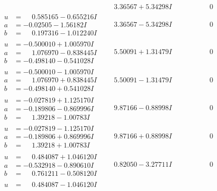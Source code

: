 \documentclass[1p]{elsarticle_modified}
\theoremstyle{definition}
\begin{document}
$$\begin{array}{c|c|c}
 & \phantom{-}3.36567 + 5.34298 I & \phantom{-0.000000 } 0 \\ \hline\begin{aligned}
u &= \phantom{-}0.585165 - 0.655216 I \\
a &= -0.02505 - 1.56182 I \\
b &= \phantom{-}0.197316 - 1.012240 I\end{aligned}
 & \phantom{-}3.36567 - 5.34298 I & \phantom{-0.000000 } 0 \\ \hline\begin{aligned}
u &= -0.500010 + 1.005970 I \\
a &= \phantom{-}1.076970 - 0.838445 I \\
b &= -0.498140 - 0.541028 I\end{aligned}
 & \phantom{-}5.50091 + 1.31479 I & \phantom{-0.000000 } 0 \\ \hline\begin{aligned}
u &= -0.500010 - 1.005970 I \\
a &= \phantom{-}1.076970 + 0.838445 I \\
b &= -0.498140 + 0.541028 I\end{aligned}
 & \phantom{-}5.50091 - 1.31479 I & \phantom{-0.000000 } 0 \\ \hline\begin{aligned}
u &= -0.027819 + 1.125170 I \\
a &= -0.189806 - 0.869996 I \\
b &= \phantom{-}1.39218 - 1.00783 I\end{aligned}
 & \phantom{-}9.87166 - 0.88998 I & \phantom{-0.000000 } 0 \\ \hline\begin{aligned}
u &= -0.027819 - 1.125170 I \\
a &= -0.189806 + 0.869996 I \\
b &= \phantom{-}1.39218 + 1.00783 I\end{aligned}
 & \phantom{-}9.87166 + 0.88998 I & \phantom{-0.000000 } 0 \\ \hline\begin{aligned}
u &= \phantom{-}0.484087 + 1.046120 I \\
a &= -0.532918 - 0.890610 I \\
b &= \phantom{-}0.761211 - 0.508120 I\end{aligned}
 & \phantom{-}0.82050 - 3.27711 I & \phantom{-0.000000 } 0 \\ \hline\begin{aligned}
u &= \phantom{-}0.484087 - 1.046120 I \\

\end{aligned}
\end{array}$$
\end{document}
